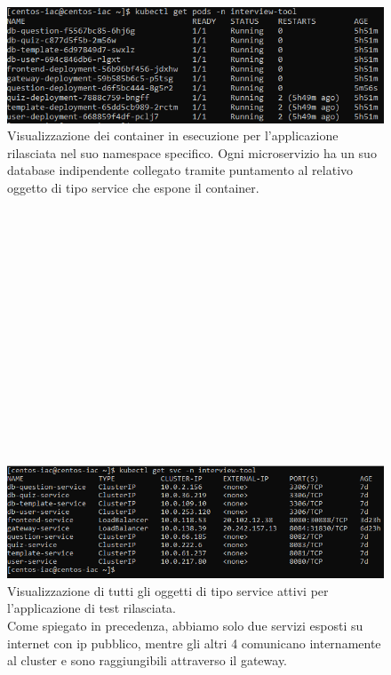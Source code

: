 \documentclass[a4paper,12pt]{report}
\begin{document}
\begin{figure}[h]
	\includegraphics[width=1.0\textwidth]{app_micro2}
    \caption{Visualizzazione dei container in esecuzione per l'applicazione rilasciata nel suo namespace specifico. Ogni microservizio ha un suo database indipendente collegato tramite puntamento al relativo oggetto di tipo service che espone il container.}
    \label{fig:app_micro2}
\end{figure}   \leavevmode \\ \\ \\ \\ \\ \\ \\ \\ \\ \\ \\ \\ \\ \\ 
\begin{figure}[h]
	\includegraphics[width=1.0\textwidth]{app_micro3}
    \caption{Visualizzazione di tutti gli oggetti di tipo service attivi per l'applicazione di test rilasciata.\\Come spiegato in precedenza, abbiamo solo due servizi esposti su internet con ip pubblico, mentre gli altri 4 comunicano internamente al cluster e sono raggiungibili attraverso il gateway.}
    \label{fig:app_micro3}
\end{figure} \leavevmode \\ \\ \\ \\ \\ 
\end{document}
